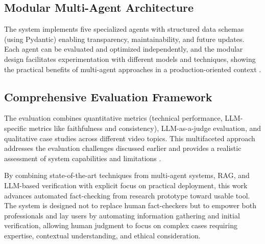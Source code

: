 \documentclass[12pt,a4paper]{article}
\begin{document}
\subsection{Modular Multi-Agent Architecture}

The system implements five specialized agents with structured data schemas (using Pydantic) enabling transparency, maintainability, and future updates. Each agent can be evaluated and optimized independently, and the modular design facilitates experimentation with different models and techniques, showing the practical benefits of multi-agent approaches in a production-oriented context \citep{hysonlab2025factagent, chen2024local, ma2025guided}.

\subsection{Comprehensive Evaluation Framework}

The evaluation combines quantitative metrics (technical performance, LLM-specific metrics like faithfulness and consistency), LLM-as-a-judge evaluation, and qualitative case studies across different video topics. This multifaceted approach addresses the evaluation challenges discussed earlier and provides a realistic assessment of system capabilities and limitations \citep{raschka2025llmeval, ruder2025llmeval}.

By combining state-of-the-art techniques from multi-agent systems, RAG, and LLM-based verification with explicit focus on practical deployment, this work advances automated fact-checking from research prototype toward usable tool. The system is designed not to replace human fact-checkers but to empower both professionals and lay users by automating information gathering and initial verification, allowing human judgment to focus on complex cases requiring expertise, contextual understanding, and ethical consideration.



\end{document}
